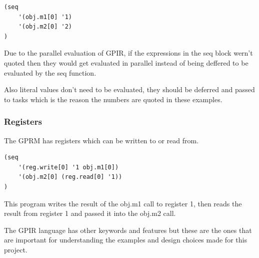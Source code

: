 \begin{lstlisting}[style=myGPC]
(seq 
    '(obj.m1[0] '1)
    '(obj.m2[0] '2)
)
\end{lstlisting}

Due to the parallel evaluation of GPIR, if the expressions in the seq block wern't quoted then
they would get evaluated in parallel instead of being deffered to be evaluated by the seq function.

Also literal values don't need to be evaluated, they should be deferred and passed to tasks which is
the reason the numbers are quoted in these examples.

\subsubsection{Registers}

The GPRM has registers which can be written to or read from.

\begin{lstlisting}[style=myGPIR]
(seq
    '(reg.write[0] '1 obj.m1[0])
    '(obj.m2[0] (reg.read[0] '1))
)
\end{lstlisting}

This program writes the result of the obj.m1 call to register 1,
then reads the result from register 1 and passed it into the obj.m2 call.

The GPIR language has other keywords and features but these are the ones that are important for
understanding the examples and design choices made for this project.
